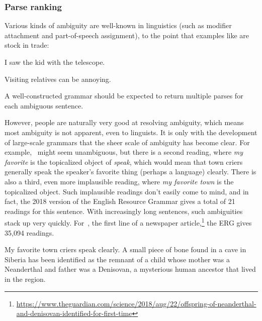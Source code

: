 \documentclass[output=paper,nonflat]{langsci/langscibook}
\begin{document}
\subsubsection{Parse ranking}
\label{cl:prac:rank}

Various kinds of ambiguity are well-known in linguistics
(such as modifier attachment and part-of-speech assignment),
to the point that examples like  are stock in trade:

\begin{exe}
\ex\label{cl:ambig-telescope} 
\begin{xlist}
\item I saw the kid with the telescope.
\item Visiting relatives can be annoying.
\end{xlist}
\end{exe}

\noindent
A well-constructed grammar should be expected to return multiple
parses for each ambiguous sentence.

However, people are naturally very good at resolving ambiguity,
which means most ambiguity is not apparent, even to linguists.
It is only with the development of large-scale grammars that the sheer scale of ambiguity has become clear.
For example, ~might seem unambiguous,
but there is a second reading, where \textit{my favorite} is the topicalized object of \textit{speak},
which would mean that town criers generally speak the speaker's favorite thing (perhaps a language) clearly.
There is also a third, even more implausible reading, where \textit{my favorite town} is the topicalized object.
Such implausible readings don't easily come to mind,
and in fact, the 2018 version of the English Resource Grammar \citep{Flickinger2000a,Flickinger2011a-u}
gives a total of 21 readings for this sentence.
With increasingly long sentences, such ambiguities stack up very quickly.
For~, the first line of a newspaper article,\footnote{%
	\url{https://www.theguardian.com/science/2018/aug/22/offspring-of-neanderthal-and-denisovan-identified-for-first-time}
}
the ERG gives 35,094 readings.

\begin{exe}
\ex\label{cl:ex:ambig-simple}
My favorite town criers speak clearly.
\ex\label{cl:ex:ambig-many}
A small piece of bone found in a cave in Siberia has been identified
as the remnant of a child whose mother was a Neanderthal and father was a Denisovan,
a mysterious human ancestor that lived in the region.
\end{exe}
\end{document}

